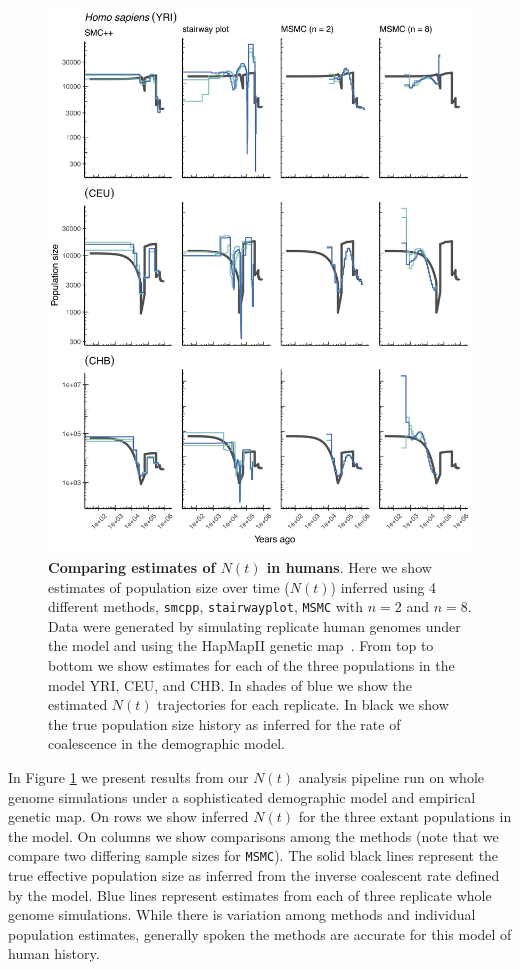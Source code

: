 \documentclass[12pt,halfline,a4paper]{ouparticle}
\newcommand{\MSMC}{\texttt{MSMC}\xspace}
\newcommand{\smcpp}{\texttt{smcpp}\xspace}
\begin{document}
\begin{figure}
\begin{center}
\includegraphics[width=0.8\linewidth]{display_items/homo_sapiens_mask_Ragsdale.png}
\caption{\textbf{Comparing estimates of $N(t)$ in humans}. Here we show estimates of population
size over time ($N(t)$) inferred using 4 different methods, \smcpp, \texttt{stairwayplot},
\MSMC with $n=2$ and $n=8$. Data were generated by simulating
replicate human genomes under the \cite{ragsdale2019models} model and using the
HapMapII genetic map~\citep{international2007second}. From top to bottom we show estimates for each
of the three populations in the model YRI, CEU, and CHB. In shades of blue we show the estimated
$N(t)$ trajectories for each replicate. In black we show the true population size history as inferred
for the rate of coalescence in the demographic model.}
\label{fig:n_t_ragsdale}
\end{center}
\end{figure}


In Figure \ref{fig:n_t_ragsdale} we present results from our $N(t)$ analysis pipeline
run on whole genome simulations under a sophisticated demographic model
and empirical genetic map. On rows
we show inferred $N(t)$ for the three extant populations in the model.
On columns we show comparisons among the methods (note that we compare two differing
sample sizes for \MSMC). The solid black lines represent the true effective population
size as inferred from the inverse coalescent rate defined by the model.
Blue lines represent estimates from each of three replicate whole genome simulations.
While there is variation among methods and individual population estimates,
generally spoken the methods are accurate for this model of human history.
\end{document}
